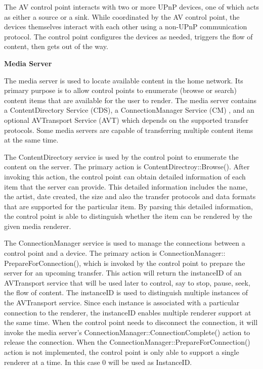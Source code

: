 The AV control point interacts with two or more UPnP
devices, one of which acts as either a source or a sink. While coordinated by
the AV control point, the devices themselves interact with each other using a
non-UPnP communication protocol. The control point configures the devices as
needed, triggers the flow of content, then gets out of the way.

\textbf{Media Server}

The media server is used to locate available content in the home network. Its 
primary purpose is to allow control points to enumerate (browse or search) 
content items that are available for the user to render. The media server 
contains a ContentDirectory Service (CDS), a ConnectionManager Service (CM) 
, and an optional AVTransport Service (AVT) which depends on the supported 
transfer protocols. Some media servers are capable of transferring multiple 
content items at the same time. 

The ContentDirectory service is used by the control point to enumerate the content 
on the server. The primary action is ContentDirectroy::Browse(). After 
invoking this action, the control point can obtain detailed information of each 
item that the server can provide. This detailed information includes the name, 
the artist, date created, the size and also the transfer protocols and data formats that are
supported for the particular item. By parsing this detailed information, 
the control point is able to distinguish whether the item can be rendered by the 
given media renderer. 

The ConnectionManager service is used to manage the connections between a 
control point and a device. The primary action is 
ConnectionManager:: PrepareForConnection(), which is invoked by the control 
point to prepare the server for an upcoming transfer. This 
action will return the instanceID of an AVTransport service that will be used 
later to control, say to stop, pause, seek, the flow of content. The instanceID is used to distinguish multiple instances of the AVTransport service. Since each instance is associated with a particular connection to the renderer, the instanceID enables multiple renderer support at the same time. When the 
control point needs to disconnect the connection, it will invoke the media 
server's ConnectionManager::ConnectionComplete() action to release the 
connection. When the ConnectionManager::PrepareForConnection() action is not 
implemented, the control point is only able to support a single renderer at a 
time. In this case 0 will be used as InstanceID. 

